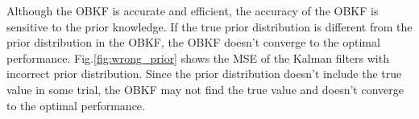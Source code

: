 Although the OBKF is accurate and efficient, the accuracy of the OBKF is sensitive to the prior knowledge. If the true prior distribution is different from the prior distribution in the OBKF, the OBKF doesn't converge to the optimal performance. Fig.\ref{fig:wrong_prior} shows the MSE of the Kalman filters with incorrect prior distribution. Since the prior distribution doesn't include the true value in some trial, the OBKF may not find the true value and doesn't converge to the optimal performance. 